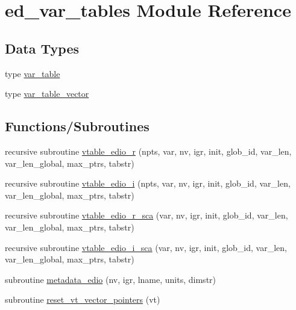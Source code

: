 \hypertarget{namespaceed__var__tables}{}\section{ed\+\_\+var\+\_\+tables Module Reference}
\label{namespaceed__var__tables}
\subsection*{Data Types}
\begin{DoxyCompactItemize}
\item 
type \hyperlink{structed__var__tables_1_1var__table}{var\+\_\+table}
\item 
type \hyperlink{structed__var__tables_1_1var__table__vector}{var\+\_\+table\+\_\+vector}
\end{DoxyCompactItemize}
\subsection*{Functions/\+Subroutines}
\begin{DoxyCompactItemize}
\item 
recursive subroutine \hyperlink{namespaceed__var__tables_af708758ab77f52cfcaf86b8e079d1ac6}{vtable\+\_\+edio\+\_\+r} (npts, var, nv, igr, init, glob\+\_\+id, var\+\_\+len, var\+\_\+len\+\_\+global, max\+\_\+ptrs, tabstr)
\item 
recursive subroutine \hyperlink{namespaceed__var__tables_ab691217cef9253738e526499e054a9d1}{vtable\+\_\+edio\+\_\+i} (npts, var, nv, igr, init, glob\+\_\+id, var\+\_\+len, var\+\_\+len\+\_\+global, max\+\_\+ptrs, tabstr)
\item 
recursive subroutine \hyperlink{namespaceed__var__tables_ab31d558ee32110b06b2fc41dd2e2070b}{vtable\+\_\+edio\+\_\+r\+\_\+sca} (var, nv, igr, init, glob\+\_\+id, var\+\_\+len, var\+\_\+len\+\_\+global, max\+\_\+ptrs, tabstr)
\item 
recursive subroutine \hyperlink{namespaceed__var__tables_a4a36c3fac62213e4eba4ffa37efbc3cc}{vtable\+\_\+edio\+\_\+i\+\_\+sca} (var, nv, igr, init, glob\+\_\+id, var\+\_\+len, var\+\_\+len\+\_\+global, max\+\_\+ptrs, tabstr)
\item 
subroutine \hyperlink{namespaceed__var__tables_a163fc43f01ed02a236a290d4b1d9575b}{metadata\+\_\+edio} (nv, igr, lname, units, dimstr)
\item 
subroutine \hyperlink{namespaceed__var__tables_aed76c1293872b5f6cf4c39c0747d2bb4}{reset\+\_\+vt\+\_\+vector\+\_\+pointers} (vt)
\end{DoxyCompactItemize}
